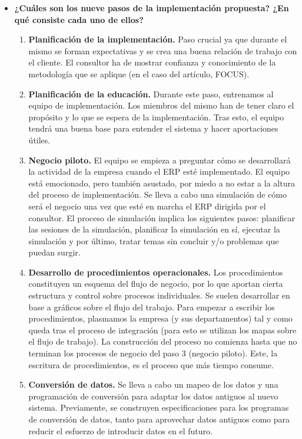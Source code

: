 \documentclass[11pt,a4paper]{article}
\begin{document}
\begin{itemize}
\item \textbf{¿Cuáles son los nueve pasos de la implementación propuesta? ¿En qué consiste cada uno de ellos?}
\begin{enumerate}
\item \textbf{Planificación de la implementación.} 
Paso crucial ya que durante el mismo se forman expectativas y se crea una buena relación de trabajo con el cliente. El consultor ha de mostrar confianza y conocimiento de la metodología que se aplique (en el caso del artículo, FOCUS). 

\item \textbf{Planificación de la educación.} 
Durante este paso, entrenamos al equipo de implementación. Los miembros del mismo han de tener claro el propósito y lo que se espera de la implementación. Tras esto, el equipo tendrá una buena base para entender el sistema y hacer aportaciones útiles.

\item \textbf{Negocio piloto.}
El equipo se empieza a preguntar cómo se desarrollará la actividad de la empresa cuando el ERP esté implementado. El equipo está emocionado, pero también asustado, por miedo a no estar a la altura del proceso de implementación. Se lleva a cabo una simulación de cómo será el negocio una vez que esté en marcha el ERP dirigida por el consultor. El proceso de simulación implica los siguientes pasos: planificar las sesiones de la simulación, planificar la simulación en sí, ejecutar la simulación y por último, tratar temas sin concluir y/o problemas que puedan surgir.

\item \textbf{Desarrollo de procedimientos operacionales.}
Los procedimientos constituyen un esquema del flujo de negocio, por lo que aportan cierta estructura y control sobre procesos individuales. Se suelen desarrollar en base a gráficos sobre el flujo del trabajo. Para empezar a escribir los procedimientos, plasmamos la empresa (y sus departamentos) tal y como queda tras el proceso de integración (para esto se utilizan los mapas sobre el flujo de trabajo). La construcción del proceso no comienza hasta que no terminan los procesos de negocio del paso 3 (negocio piloto). Este, la escritura de procedimientos, es el proceso que más tiempo consume. 

\item \textbf{Conversión de datos.} 
Se lleva a cabo un mapeo de los datos y una programación de conversión para adaptar los datos antiguos al nuevo sistema. Previamente, se construyen especificaciones para los programas de conversión de datos, tanto para aprovechar datos antiguos como para reducir el esfuerzo de introducir datos en el futuro.


\end{enumerate}
\end{itemize}
\end{document}
